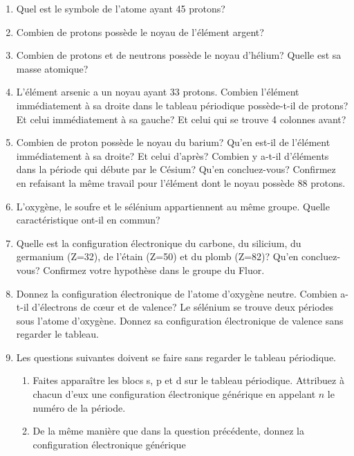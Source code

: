 \begin{enumerate}[\bf 1)]
\item Quel est le symbole de l'atome ayant 45 protons?
\item Combien de protons poss\`ede le noyau de l'\'el\'ement argent?
\item Combien de protons et de neutrons poss\`ede le noyau d'h\'elium? Quelle est sa masse atomique?
\item L'\'el\'ement arsenic a un noyau ayant 33 protons. Combien l'\'el\'ement imm\'ediatement \`a sa droite dans le tableau
p\'eriodique poss\`ede-t-il de protons? Et celui imm\'ediatement \`a sa gauche? Et celui qui se trouve
4 colonnes avant?
\item Combien de proton poss\`ede le noyau du barium? Qu'en est-il de l'\'el\'ement imm\'ediatement \`a sa droite? Et celui d'apr\`es?
Combien y a-t-il d'\'el\'ements dans la p\'eriode qui d\'ebute par le C\'esium? Qu'en concluez-vous? Confirmez en refaisant la m\^eme travail pour
l'\'el\'ement dont le noyau poss\`ede 88 protons.
\item L'oxyg\`ene, le soufre et le s\'el\'enium appartiennent au m\^eme groupe.
Quelle caract\'eristique ont-il en commun?
\item Quelle est la configuration \'electronique du carbone, du silicium, du germanium (Z=32),
de l'\'etain (Z=50) et du plomb (Z=82)?
Qu'en concluez-vous? Confirmez votre hypoth\`ese dans le groupe du Fluor.
\item Donnez la configuration \'electronique de l'atome d'oxyg\`ene neutre.
Combien a-t-il d'\'electrons de c\oe ur et de valence?
Le s\'el\'enium se trouve deux p\'eriodes sous l'atome d'oxyg\`ene.
Donnez sa configuration \'electronique de valence sans regarder le tableau.
\item Les questions suivantes doivent se faire sans regarder le tableau p\'eriodique.
\begin{enumerate}
\item Faites appara\^itre les blocs s, p et d sur le tableau p\'eriodique.
Attribuez \`a chacun d'eux une configuration \'electronique g\'en\'erique en appelant $n$ le num\'ero
de la p\'eriode.
\item De la m\^eme mani\`ere que dans la question pr\'ec\'edente, donnez la configuration \'electronique g\'en\'erique

\end{enumerate}
\end{enumerate}
